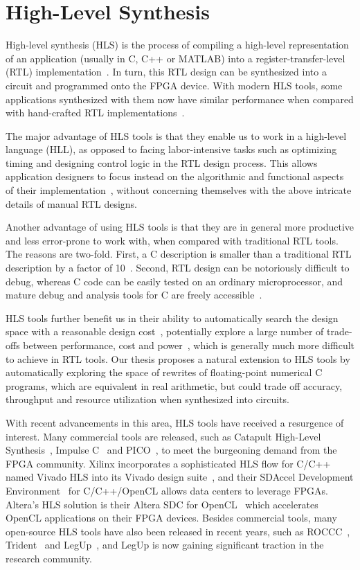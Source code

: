 \section{High-Level Synthesis}
\label{bg:sec:high_level_synthesis}

High-level synthesis (HLS) is the process of compiling a high-level
representation of an application (usually in C, C++ or MATLAB) into a
register-transfer-level (RTL) implementation~\cite{coussy, gajski}.  In
turn, this RTL design can be synthesized into a circuit and programmed onto
the FPGA device.  With modern HLS tools, some applications synthesized
with them now have similar performance when compared with hand-crafted RTL
implementations~\cite{bdti}.

The major advantage of HLS tools is that they enable us to work in a high-level
language (HLL), as opposed to facing labor-intensive tasks such as optimizing
timing and designing control logic in the RTL design process.  This allows
application designers to focus instead on the algorithmic and functional
aspects of their implementation~\cite{coussy}, without concerning themselves
with the above intricate details of manual RTL designs.

Another advantage of using HLS tools is that they are in general more
productive and less error-prone to work with, when compared with traditional
RTL tools.  The reasons are two-fold.  First, a C description is smaller than
a traditional RTL description by a factor of 10~\cite{coussy, bdti}.  Second,
RTL design can be notoriously difficult to debug, whereas C code can be easily
tested on an ordinary microprocessor, and mature debug and analysis tools for C
are freely accessible~\cite{canis13}.

HLS tools further benefit us in their ability to automatically search
the design space with a reasonable design cost~\cite{bdti}, potentially
explore a large number of trade-offs between performance, cost and
power~\cite{mcfarland}, which is generally much more difficult to achieve
in RTL tools.  Our thesis proposes a natural extension to HLS tools by
automatically exploring the space of rewrites of floating-point numerical
C programs, which are equivalent in real arithmetic, but could trade off
accuracy, throughput and resource utilization when synthesized into circuits.

With recent advancements in this area, HLS tools have received a resurgence
of interest.  Many commercial tools are released, such as Catapult
High-Level Synthesis~\cite{catapultc}, Impulse C~\cite{impulsec} and
PICO~\cite{schreiber02}, to meet the burgeoning demand from the FPGA community.
Xilinx incorporates a sophisticated HLS flow for C/C++ named Vivado HLS into
its Vivado design suite~\cite{vivado_hls}, and their SDAccel Development
Environment~\cite{sdaccel} for C/C++/OpenCL allows data centers to leverage
FPGAs.  Altera's HLS solution is their Altera SDC for OpenCL~\cite{aoc} which
accelerates OpenCL applications on their FPGA devices.  Besides commercial
tools, many open-source HLS tools have also been released in recent years, such
as ROCCC~\cite{roccc}, Trident~\cite{tripp05} and LegUp~\cite{legup}, and LegUp
is now gaining significant traction in the research community.


